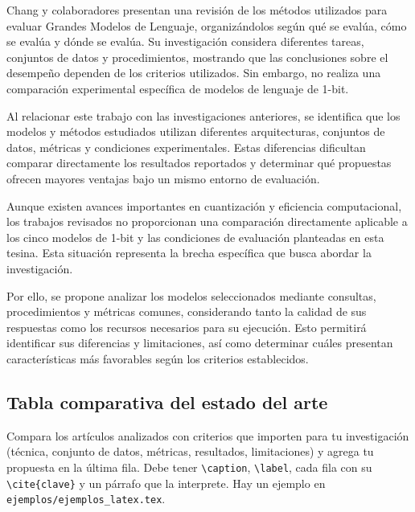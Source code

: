 Chang y colaboradores \cite{llmEvaluation} presentan una revisión de los métodos utilizados para evaluar Grandes Modelos de Lenguaje, organizándolos según qué se evalúa, cómo se evalúa y dónde se evalúa. Su investigación considera diferentes tareas, conjuntos de datos y procedimientos, mostrando que las conclusiones sobre el desempeño dependen de los criterios utilizados. Sin embargo, no realiza una comparación experimental específica de modelos de lenguaje de 1-bit.

Al relacionar este trabajo con las investigaciones anteriores, se identifica que los modelos y métodos estudiados utilizan diferentes arquitecturas, conjuntos de datos, métricas y condiciones experimentales. Estas diferencias dificultan comparar directamente los resultados reportados y determinar qué propuestas ofrecen mayores ventajas bajo un mismo entorno de evaluación.

Aunque existen avances importantes en cuantización y eficiencia computacional, los trabajos revisados no proporcionan una comparación directamente aplicable a los cinco modelos de 1-bit y las condiciones de evaluación planteadas en esta tesina. Esta situación representa la brecha específica que busca abordar la investigación.

Por ello, se propone analizar los modelos seleccionados mediante consultas, procedimientos y métricas comunes, considerando tanto la calidad de sus respuestas como los recursos necesarios para su ejecución. Esto permitirá identificar sus diferencias y limitaciones, así como determinar cuáles presentan características más favorables según los criterios establecidos.

\subsection{Tabla comparativa del estado del arte} \label{sec:tabla_estado_arte} %

\begin{guia}
Compara los artículos analizados con criterios que importen para tu investigación (técnica, conjunto de datos,
métricas, resultados, limitaciones) y agrega tu propuesta en la última fila. Debe tener \verb|\caption|, \verb|\label|,
cada fila con su \verb|\cite{clave}| y un párrafo que la interprete. Hay un ejemplo en \texttt{ejemplos/ejemplos\_latex.tex}.
\end{guia}


